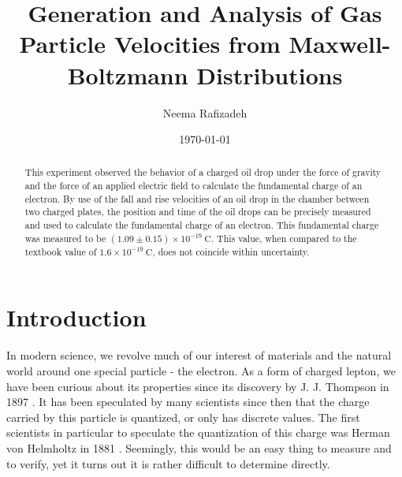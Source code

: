 \documentclass[%
 reprint,
 amsmath,amssymb,
 aps,
]{revtex4-2}
\begin{document}

\title{Generation and Analysis of Gas Particle Velocities from Maxwell-Boltzmann Distributions}%

\author{Neema Rafizadeh}
%

\date{\today}

\begin{abstract}
This experiment observed the behavior of a charged oil drop under the force of gravity and the force of an applied electric field to calculate the fundamental charge of an electron. By use of the fall and rise velocities of an oil drop in the chamber between two charged plates, the position and time of the oil drops can be precisely measured and used to calculate the fundamental charge of an electron. This fundamental charge was measured to be $(1.09\pm 0.15)\times10^{-19} \ \mathrm{C}$. This value, when compared to the textbook value of $1.6 \times 10^{-19} \ \mathrm{C}$, does not coincide within uncertainty.
\end{abstract}


\maketitle


\section{Introduction \protect\\ }

In modern science, we revolve much of our interest of materials and the natural world around one special particle - the electron. As a form of charged lepton, we have been curious about its properties since its discovery by J. J. Thompson in 1897 \cite{knight}. It has been speculated by many scientists since then that the charge carried by this particle is quantized, or only has discrete values. The first scientists in particular to speculate the quantization of this charge was Herman von Helmholtz in 1881 \cite{theodore}. Seemingly, this would be an easy thing to measure and to verify, yet it turns out it is rather difficult to determine directly.
\end{document}
